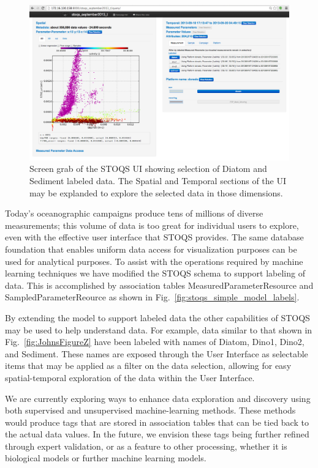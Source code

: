 \documentclass[conference]{IEEEtran}
\begin{document}
\begin{figure}[htbp]
\centering
\includegraphics[width=0.9\linewidth]{LabeledSelectionUI.png}
\caption{Screen grab of the STOQS UI showing selection of Diatom and Sediment labeled data. The Spatial and Temporal sections of the UI may be explanded to explore the selected data in those dimensions.}
\label{fig:LabeledSelectionUI}
\end{figure}

Today's oceanographic campaigns produce tens of millions of diverse measurements; this volume of data is too great for individual users to explore, even with the effective user interface that STOQS provides.  The same database foundation that enables uniform data access for visualization purposes can be used for analytical purposes. To assist with the operations required by machine learning techniques we have modified the STOQS schema to support labeling of data. This is accomplished by association tables MeasuredParameterResource and SampledParameterReource as shown in Fig.~\ref{fig:stoqs_simple_model_labels}.

By extending the model to support labeled data the other capabilities of STOQS may be used to help understand data. For example, data similar to that shown in Fig.~\ref{fig:JohnsFigureZ} have been labeled with names of Diatom, Dino1, Dino2, and Sediment. These names are exposed through the User Interface as selectable items that may be applied as a filter on the data selection, allowing for easy spatial-temporal exploration of the data within the User Interface.

We are currently exploring ways to enhance data exploration and discovery using both supervised and unsupervised machine-learning methods.  These methods would produce tags that are stored in association tables that can be tied back to the actual data values.  In the future, we envision these tags being further refined through expert validation, or as a feature to other processing, whether it is biological models or further machine learning models. 
\end{document}
